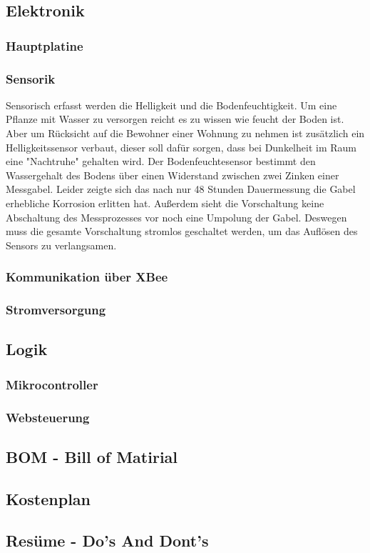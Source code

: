 \documentclass[]{IEEEtran}
\begin{document}
	\subsection{Elektronik}
	
	\subsubsection{Hauptplatine}
	
	\subsubsection{Sensorik}
	Sensorisch erfasst werden die Helligkeit und die Bodenfeuchtigkeit. 
	Um eine Pflanze mit Wasser zu versorgen reicht es zu wissen wie feucht der Boden ist. 
	Aber um Rücksicht auf die Bewohner einer Wohnung zu nehmen ist zusätzlich ein Helligkeitssensor verbaut, dieser soll dafür sorgen, dass bei Dunkelheit im Raum eine "Nachtruhe" gehalten wird.
	Der Bodenfeuchtesensor bestimmt den Wassergehalt des Bodens über einen Widerstand zwischen zwei Zinken einer Messgabel. 
	Leider zeigte sich das nach nur 48 Stunden Dauermessung die Gabel erhebliche Korrosion erlitten hat.
	Außerdem sieht die Vorschaltung keine Abschaltung des Messprozesses vor noch eine Umpolung der Gabel.
	Deswegen muss die gesamte Vorschaltung stromlos geschaltet werden, um das Auflösen des Sensors zu verlangsamen. 
	\subsubsection{Kommunikation über XBee}
	
	\subsubsection{Stromversorgung}
	
	
	\subsection{Logik}
	
		\subsubsection{Mikrocontroller}
	
		\subsubsection{Websteuerung}
	
	\subsection{BOM - Bill of Matirial}
	
	\subsection{Kostenplan}
	
	\subsection{Resüme - Do's And Dont's}	
\end{document}
